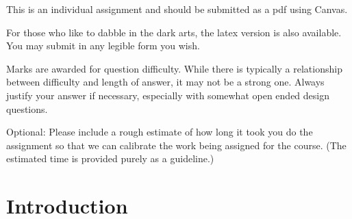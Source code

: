 \documentclass[9pt, addpoints]{exam}
\begin{document}
\large     
\vspace{2cm}
\begin{center}
    \begin{minipage}{40em}
        \begin{center}
            This is an individual assignment and should be submitted as a pdf using Canvas.  
        \end{center}
        
        \vspace{6pt}
    For those who like to dabble in the dark arts, the latex version 
    is also available. You may submit in any legible form you wish.
    
        \vspace{6pt}
    Marks are awarded for question difficulty. While there is 
    typically a relationship between difficulty and length of answer,
    it may not be a strong one. Always justify your answer if necessary,
    especially with somewhat open ended design questions.

    \vspace{6pt}
    Optional: Please include a rough estimate of how long it took you do 
    the assignment so that we can calibrate the work being assigned 
    for the course. (The estimated time is provided purely as a guideline.)
    \par
    \vspace{12pt}
    \end{minipage}
\end{center}

\vspace{4cm}
\begin{center}
    \gradetable[h]
\end{center}
\newpage
\section*{Introduction}


\end{document}
